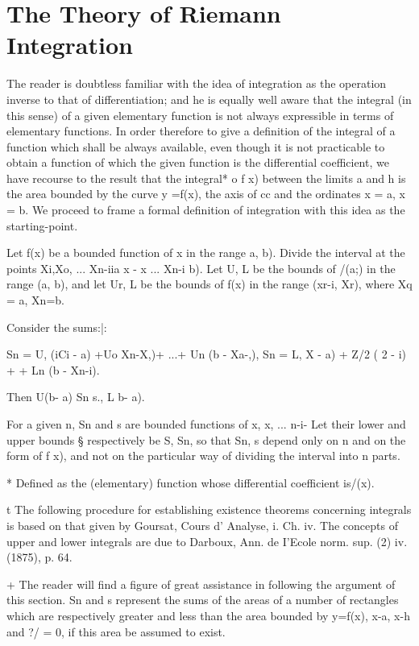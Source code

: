 \chapter{The Theory of Riemann Integration} 


The reader is doubtless familiar with the idea of integration as the
operation inverse to that of differentiation; and he is equally well
aware that the integral (in this sense) of a given elementary function
is not always expressible in terms of elementary functions. In order
therefore to give a definition of the integral of a function which
shall be always available, even though it is not practicable to obtain
a function of which the given function is the differential
coefficient, we have recourse to the result that the integral* o f x)
between the limits a and h is the area bounded by the curve y =f(x),
the axis of cc and the ordinates x = a, x = b. We proceed to frame a
formal definition of integration with this idea as the starting-point.


Let f(x) be a bounded function of x in the range a, b). Divide the
interval at the points Xi,Xo, ... Xn-iia x - x ... Xn-i b). Let U, L
be the bounds of /(a;) in the range (a, b), and let Ur, L be the
bounds of f(x) in the range (xr-i, Xr), where Xq = a, Xn=b.

Consider the sums:|:

Sn = U, (iCi - a) +Uo Xn-X,)+ ...+ Un (b - Xa-,), Sn = L, X - a) + Z/2
( 2 - i) +    + Ln (b - Xn-i).

Then U(b- a) Sn s., L b- a).

For a given n, Sn and s are bounded functions of x, x, ... n-i- Let
their lower and upper bounds § respectively be S, Sn, so that Sn, s
depend only on n and on the form of f x), and not on the particular
way of dividing the interval into n parts.

* Defined as the (elementary) function whose differential coefficient
is/(x).

t The following procedure for establishing existence theorems
concerning integrals is based on that given by Goursat, Cours d'
Analyse, i. Ch. iv. The concepts of upper and lower integrals are due
to Darboux, Ann. de I'Ecole norm. sup. (2) iv. (1875), p. 64.

+ The reader will find a figure of great assistance in following the
argument of this section. Sn and s represent the sums of the areas of
a number of rectangles which are respectively greater and less than
the area bounded by y=f(x), x-a, x-h and ?/ = 0, if this area be
assumed to exist.

